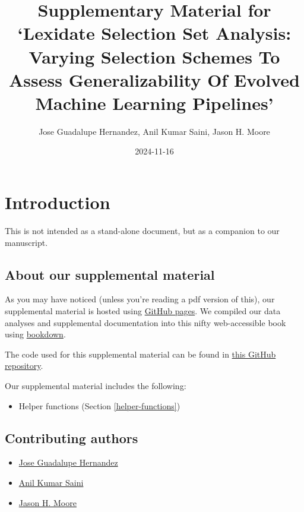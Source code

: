 \documentclass[
]{book}
\title{Supplementary Material for `Lexidate Selection Set Analysis: Varying Selection Schemes To Assess Generalizability Of Evolved Machine Learning Pipelines'}
\author{Jose Guadalupe Hernandez, Anil Kumar Saini, Jason H. Moore}
\date{2024-11-16}
\providecommand{\tightlist}{%
  \setlength{\itemsep}{0pt}\setlength{\parskip}{0pt}}
\begin{document}
\maketitle

{
\setcounter{tocdepth}{1}
\tableofcontents
}
\hypertarget{introduction}{%
\chapter{Introduction}\label{introduction}}

This is not intended as a stand-alone document, but as a companion to our manuscript.

\hypertarget{about-our-supplemental-material}{%
\section{About our supplemental material}\label{about-our-supplemental-material}}

As you may have noticed (unless you're reading a pdf version of this), our supplemental material is hosted using \href{https://pages.github.com/}{GitHub pages}.
We compiled our data analyses and supplemental documentation into this nifty web-accessible book using \href{https://bookdown.org}{bookdown}.

The code used for this supplemental material can be found in \href{https://github.com/jgh9094/lexidate-holdout-analysis}{this GitHub repository}.

Our supplemental material includes the following:

\begin{itemize}
\tightlist
\item
  Helper functions (Section \ref{helper-functions})
\end{itemize}

\hypertarget{contributing-authors}{%
\section{Contributing authors}\label{contributing-authors}}

\begin{itemize}
\tightlist
\item
  \href{https://jgh9094.github.io/}{Jose Guadalupe Hernandez}
\item
  \href{https://theaksaini.github.io/}{Anil Kumar Saini}
\item
  \href{https://jasonhmoore.org/}{Jason H. Moore}
\end{itemize}
\end{document}
